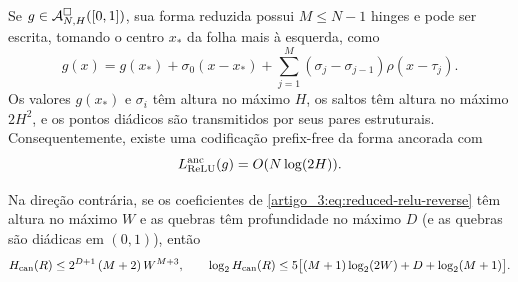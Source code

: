 \begin{proposition}\label{map:artigo_3:5.4}
\label{artigo_3:prop:anchored-relu-code}
Se $g\in\mathcal{A}^\square_{N,H}([0,1])$, sua forma reduzida possui
$M\le N-1$ hinges e pode ser escrita, tomando o centro $x_*$ da folha mais à
esquerda, como
\begin{equation}
 g(x)=g(x_*)+\sigma_0(x-x_*)
      +\sum_{j=1}^{M}(\sigma_j-\sigma_{j-1})\rho(x-\tau_j).
 \label{artigo_3:eq:anchored-relu-form}
\end{equation}
Os valores $g(x_*)$ e $\sigma_i$ têm altura no máximo $H$, os saltos têm
altura no máximo $2H^2$, e os pontos diádicos são transmitidos por seus pares
estruturais. Consequentemente, existe uma codificação prefix-free da forma
ancorada com
\begin{equation}
 L_{\rm ReLU}^{\rm anc}(g)=O(N\log(2H)).
 \label{artigo_3:eq:anchored-network-bits}
\end{equation}

Na direção contrária, se os coeficientes de
\eqref{artigo_3:eq:reduced-relu-reverse} têm altura no máximo $W$ e as quebras têm
profundidade no máximo $D$ (e as quebras são diádicas em $(0,1)$), então
\begin{equation}
 H_{\rm can}(R)\le 2^{D+1}\,(M+2)\,W^{M+3},
 \qquad
 \log_2 H_{\rm can}(R)
 \le 5\bigl[(M+1)\log_2(2W)+D+\log_2(M+1)\bigr].
 \label{artigo_3:eq:reverse-height-bit-bound}
\end{equation}
\end{proposition}

